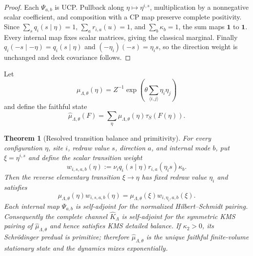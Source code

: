 \documentclass[11pt]{article}
\newtheorem{theorem}{Theorem}[section]
\theoremstyle{definition}
\theoremstyle{remark}
\newcommand{\one}{\mathbf 1}
\begin{document}
\begin{proof}
Each $\Psi_{a,b}$ is UCP.  Pullback along
$\eta\mapsto\eta^{i,s}$, multiplication by a nonnegative scalar coefficient,
and composition with a CP map preserve complete positivity.  Since
$\sum_s q_i(s\mid\eta)=1$, $\sum_a r_{i,a}(u)=1$, and
$\sum_b\kappa_b=1$, the sum maps $\one$ to $\one$.  Every internal map fixes
scalar matrices, giving the classical marginal.  Finally
$q_i(-s\mid-\eta)=q_i(s\mid\eta)$ and
$(-\eta_i)(-s)=\eta_is$, so the direction weight is unchanged and deck
covariance follows.
\end{proof}

Let
\[
 \mu_{\Lambda,\theta}(\eta)
 =Z^{-1}\exp\!\left(\theta\sum_{\langle i,j\rangle}\eta_i\eta_j\right)
\]
and define the faithful state
\[
 \widehat\mu_{\Lambda,\theta}(F)
 =\sum_\eta\mu_{\Lambda,\theta}(\eta)\tau_S(F(\eta)).
\]

\begin{theorem}[Resolved transition balance and primitivity]
\label{thm:common-origin-balance}
For every configuration $\eta$, site $i$, redraw value $s$, direction $a$, and
internal mode $b$, put $\xi=\eta^{i,s}$ and define the scalar transition weight
\[
 w_{i,s,a,b}(\eta)
 :=\nu_iq_i(s\mid\eta)r_{i,a}(\eta_is)\kappa_b.
\]
Then the reverse elementary transition $\xi\to\eta$ has fixed redraw value
$\eta_i$ and satisfies
\[
 \boxed{
 \mu_{\Lambda,\theta}(\eta)w_{i,s,a,b}(\eta)
 =\mu_{\Lambda,\theta}(\xi)
   w_{i,\eta_i,a,b}(\xi).}
\]
Each internal map $\Psi_{a,b}$ is self-adjoint for the normalized
Hilbert--Schmidt pairing.  Consequently the complete channel
$\widehat K_\Lambda$ is self-adjoint for the symmetric KMS pairing of
$\widehat\mu_{\Lambda,\theta}$ and hence satisfies KMS detailed balance.  If
$\kappa_2>0$, its Schr\"odinger predual is primitive; therefore
$\widehat\mu_{\Lambda,\theta}$ is the unique faithful finite-volume stationary
state and the dynamics mixes exponentially.
\end{theorem}
\end{document}
